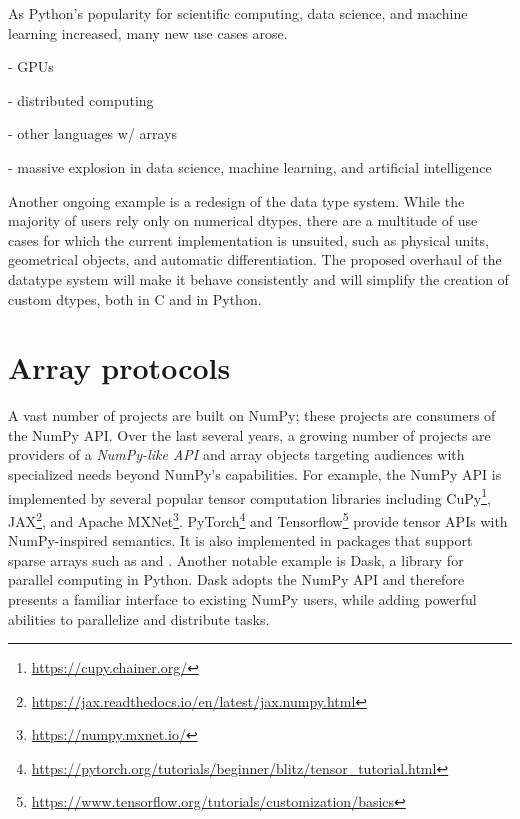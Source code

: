 As Python's popularity for scientific computing, data science, and machine
learning increased, many new use cases arose.

- GPUs

- distributed computing

- other languages w/ arrays

- massive explosion in data science, machine learning, and artificial intelligence


Another ongoing example is a redesign of the data type system.
While the majority of users rely only on numerical dtypes, there are a
multitude of use cases for which the current implementation is unsuited, such
as physical units\cite{astropy,Goldbaum2018,pint}, geometrical
objects\cite{pygeos}, and automatic differentiation\cite{pyadolc}.
The proposed overhaul of the datatype system will make it behave consistently
and will simplify the creation of custom dtypes, both in C and in Python.

\section*{Array protocols}


A vast number of projects are built on NumPy;
these projects are consumers of the NumPy API.
Over the last several years, a growing number of projects are providers of
a \emph{NumPy-like API} and array objects targeting audiences with specialized
needs beyond NumPy's capabilities.
For example, the NumPy API is implemented by several popular tensor computation
libraries including CuPy\footnote{\url{https://cupy.chainer.org/}},
JAX\footnote{\url{https://jax.readthedocs.io/en/latest/jax.numpy.html}},
and Apache MXNet\footnote{\url{https://numpy.mxnet.io/}}.
PyTorch\footnote{\url{https://pytorch.org/tutorials/beginner/blitz/tensor\_tutorial.html}}
and Tensorflow\footnote{\url{https://www.tensorflow.org/tutorials/customization/basics}}
provide tensor APIs with NumPy-inspired semantics.
It is also implemented in packages that support sparse arrays
such as  and .
Another notable example is Dask, a library for parallel computing in
Python.  Dask adopts the NumPy API and therefore presents a familiar
interface to existing NumPy users, while adding powerful abilities to
parallelize and distribute tasks.


